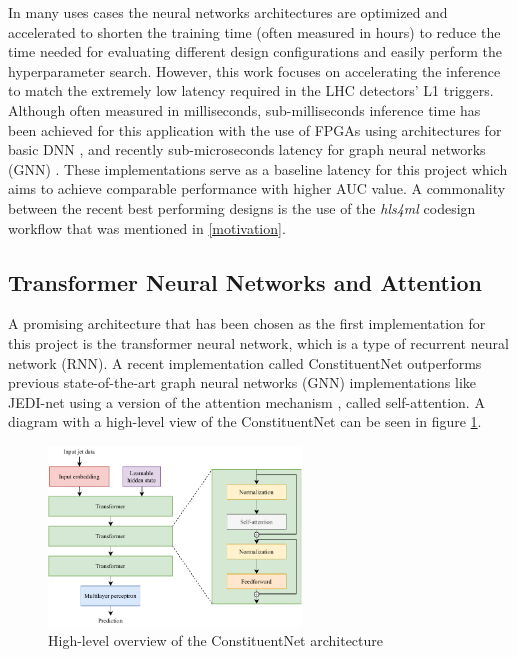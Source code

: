 In many uses cases the neural networks architectures are optimized and accelerated to shorten the training time (often measured in hours) to reduce the time needed for evaluating different design configurations and easily perform the hyperparameter search. However, this work focuses on accelerating the inference to match the extremely low latency required in the LHC detectors' L1 triggers. Although often measured in milliseconds, sub-milliseconds inference time has been achieved for this application with the use of FPGAs using architectures for basic DNN \cite{36-kreinar2018fast}, and recently sub-microseconds latency for graph neural networks (GNN) \cite{42-kreinar2020distance-weighted, 41-elabd2021graph}. These implementations serve as a baseline latency for this project which aims to achieve comparable performance with higher AUC value. A commonality between the recent best performing designs is the use of the \textit{hls4ml} codesign workflow that was mentioned in \autoref{motivation}.

\subsection{Transformer Neural Networks and Attention}
A promising architecture that has been chosen as the first implementation for this project is the transformer neural network, which is a type of recurrent neural network (RNN). A recent implementation \cite{3-yuan2021constituentnet:} called ConstituentNet outperforms previous state-of-the-art graph neural networks (GNN) implementations like JEDI-net \cite{9-newman2019jedi-net:} using a version of the attention mechanism \cite{44-vaswani2017attention}, called self-attention. A diagram with a high-level view of the ConstituentNet can be seen in figure \ref{fig:constituent-net}.

\begin{figure}[hpt!]
  \centering
  \includegraphics[trim={0cm 0cm 0cm 0cm}, width=0.6\textwidth, center]{background/constituent_net.pdf}
  \caption{High-level overview of the ConstituentNet architecture}
  \label{fig:constituent-net}
\end{figure}

